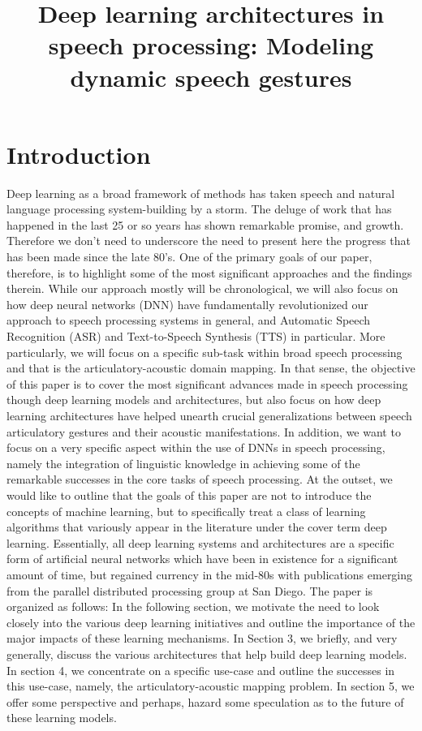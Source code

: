 \documentclass{article}[12pt]
\author{}\title{Deep learning architectures in speech processing: Modeling dynamic speech gestures}
\begin{document}
\maketitle
\section{Introduction}
Deep learning as a broad framework of methods has taken speech and natural language processing system-building by a storm. The deluge of work that has happened in the last 25 or so years has shown remarkable promise, and growth. Therefore we don't need to underscore the need to present here the progress that has been made since the late 80's. One of the primary goals of our paper, therefore, is to highlight some of the most significant approaches and the findings therein. While our approach mostly will be chronological, we will also focus on how deep neural networks (DNN) have fundamentally revolutionized our approach to speech processing systems in general, and Automatic Speech Recognition (ASR) and Text-to-Speech Synthesis (TTS) in particular. More particularly, we will focus on a specific sub-task within broad speech processing and that is the articulatory-acoustic domain mapping. In that sense, the objective of this paper is to cover the most significant advances made in speech processing though deep learning models and architectures, but also focus on how deep learning architectures have helped unearth crucial generalizations between speech articulatory gestures and their acoustic manifestations. In addition, we want to focus on a very specific aspect within the use of DNNs in speech processing, namely the integration of linguistic knowledge in achieving some of the remarkable successes in the core tasks of speech processing. At the outset, we would like to outline that the goals of this paper are not to introduce the concepts of machine learning, but to specifically treat a class of learning algorithms that variously appear in the literature under the cover term deep learning. Essentially, all deep learning systems and architectures are a specific form of artificial neural networks which have been in existence for a significant amount of time, but regained currency in the mid-80s with publications emerging from the parallel distributed processing group at San Diego. The paper is organized as follows: In the following section, we motivate the need to look closely into the various deep learning initiatives and outline the importance of the major impacts of these learning mechanisms. In Section 3, we briefly, and very generally, discuss the various architectures that help build deep learning models. In section 4, we concentrate on a specific use-case and outline the successes in this use-case, namely, the articulatory-acoustic mapping problem. In section 5, we offer some perspective and perhaps, hazard some speculation as to the future of these learning models.
\end{document}
